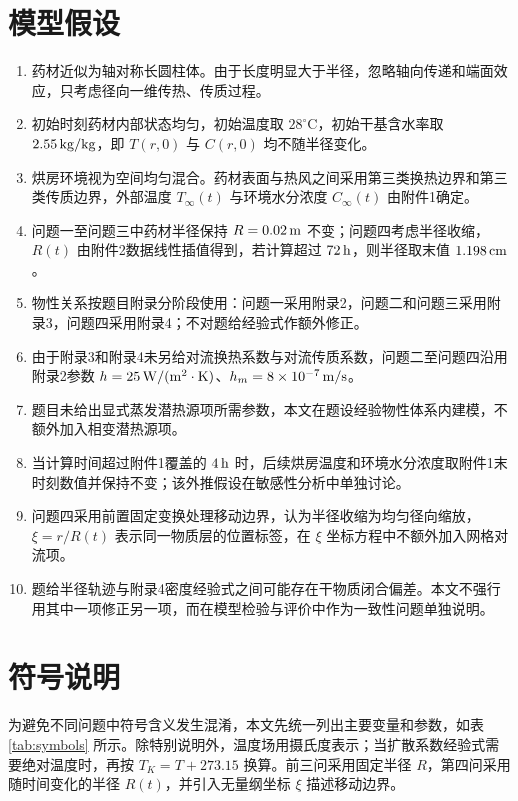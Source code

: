 \documentclass[UTF8,a4paper,12pt]{ctexart}
\numberwithin{equation}{section}
\begin{document}
\section{模型假设}
\begin{enumerate}[label=\arabic*.,leftmargin=2.5em]
  \item 药材近似为轴对称长圆柱体。由于长度明显大于半径，忽略轴向传递和端面效应，只考虑径向一维传热、传质过程。
  \item 初始时刻药材内部状态均匀，初始温度取 $28^\circ\mathrm C$，初始干基含水率取 $2.55\rm\,kg/kg$，即 $T(r,0)$ 与 $C(r,0)$ 均不随半径变化。
  \item 烘房环境视为空间均匀混合。药材表面与热风之间采用第三类换热边界和第三类传质边界，外部温度 $T_\infty(t)$ 与环境水分浓度 $C_\infty(t)$ 由附件1确定。
  \item 问题一至问题三中药材半径保持 $R=0.02\rm\,m$ 不变；问题四考虑半径收缩，$R(t)$ 由附件2数据线性插值得到，若计算超过 $72\rm\,h$，则半径取末值 $1.198\rm\,cm$。
  \item 物性关系按题目附录分阶段使用：问题一采用附录2，问题二和问题三采用附录3，问题四采用附录4；不对题给经验式作额外修正。
  \item 由于附录3和附录4未另给对流换热系数与对流传质系数，问题二至问题四沿用附录2参数 $h=25\rm\,W/(m^2\cdot K)$、$h_m=8\times10^{-7}\rm\,m/s$。
  \item 题目未给出显式蒸发潜热源项所需参数，本文在题设经验物性体系内建模，不额外加入相变潜热源项。
  \item 当计算时间超过附件1覆盖的 $4\rm\,h$ 时，后续烘房温度和环境水分浓度取附件1末时刻数值并保持不变；该外推假设在敏感性分析中单独讨论。
  \item 问题四采用前置固定变换处理移动边界，认为半径收缩为均匀径向缩放，$\xi=r/R(t)$ 表示同一物质层的位置标签，在 $\xi$ 坐标方程中不额外加入网格对流项。
  \item 题给半径轨迹与附录4密度经验式之间可能存在干物质闭合偏差。本文不强行用其中一项修正另一项，而在模型检验与评价中作为一致性问题单独说明。
\end{enumerate}

\section{符号说明}
为避免不同问题中符号含义发生混淆，本文先统一列出主要变量和参数，如表\ref{tab:symbols} 所示。除特别说明外，温度场用摄氏度表示；当扩散系数经验式需要绝对温度时，再按 $T_K=T+273.15$ 换算。前三问采用固定半径 $R$，第四问采用随时间变化的半径 $R(t)$，并引入无量纲坐标 $\xi$ 描述移动边界。
\end{document}
